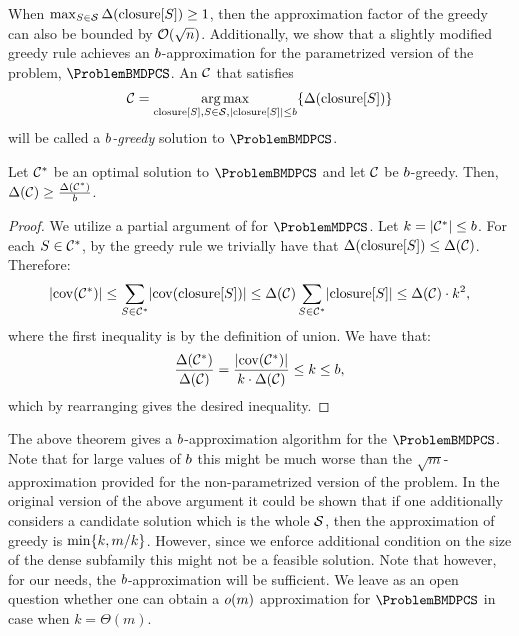 When $\max_{S \in \mathcal{S}} \Delta\mathopen{}\left( \operatorname{closure}[S] \right) \geq 1$, then the approximation factor of the greedy can also be bounded by $\mathcal{O}\mathopen{}\left( \sqrt{n} \right)$.
Additionally, we show that a slightly modified greedy rule achieves an $b$-approximation for the parametrized version of the problem, $\ProblemBMDPCS$.
An $\mathcal{C}$ that satisfies
    \[
    \mathcal{C}=\mathopen{}\operatorname*{arg\,max}_{\operatorname{closure}[S], S \in \mathcal{S}, \mathopen{}\left| \operatorname{closure}[S] \right|\leq b} \mathopen{}\left\{ \Delta\mathopen{}\left( \operatorname{closure}[S] \right) \right\}
    \]
will be called a \emph{$b$-greedy} solution to $\ProblemBMDPCS$.
\begin{theorem}\label{thm:BMDPCS-greedy}
    Let $\mathcal{C}^*$ be an optimal solution to $\ProblemBMDPCS$ and let $\mathcal{C}$ be $b$-greedy.
    Then, $\Delta\mathopen{}\left( \mathcal{C} \right) \geq \frac{\Delta\mathopen{}\left( \mathcal{C}^* \right)}{b}$.
\end{theorem}
\begin{proof}
    We utilize a partial argument of \cite{PCMSSC} for $\ProblemMDPCS$. Let $k=\mathopen{}\left| \mathcal{C}^* \right|\leq b$.
    For each $S\in \mathcal{C}^*$, by the greedy rule we trivially have that $\Delta\mathopen{}\left( \operatorname{closure}[S] \right)\leq \Delta\mathopen{}\left( \mathcal{C} \right)$.
    Therefore:
    \[
    \mathopen{}\left| \operatorname{cov}\mathopen{}\left( \mathcal{C}^* \right) \right| \leq \sum_{S\in\mathcal{C}^*}\mathopen{}\left| \operatorname{cov}\mathopen{}\left( \operatorname{closure}[S] \right) \right|\leq \Delta\mathopen{}\left( \mathcal{C} \right)\sum_{S\in\mathcal{C}^*} \mathopen{}\left| \operatorname{closure}[S] \right| \leq \Delta\mathopen{}\left( \mathcal{C} \right) \cdot k^2,
    \]
    where the first inequality is by the definition of union. We have that:
    \[
    \frac{\Delta\mathopen{}\left( \mathcal{C}^* \right)}{\Delta\mathopen{}\left( \mathcal{C} \right)}=\frac{\mathopen{}\left| \operatorname{cov}\mathopen{}\left( \mathcal{C}^* \right) \right|}{k\cdot\Delta\mathopen{}\left( \mathcal{C} \right)}\leq k\leq b,
    \]
    which by rearranging gives the desired inequality.
\end{proof}
The above theorem gives a $b$-approximation algorithm for the $\ProblemBMDPCS$. Note that for large values of $b$ this might be much worse than the $\sqrt{m}$-approximation provided for the non-parametrized version of the problem. In the original version of the above argument it could be shown that if one additionally considers a candidate solution which is the whole $\mathcal{S}$, then the approximation of greedy is $\min\mathopen{}\left\{ k, m/k \right\}$. However, since we enforce additional condition on the size of the dense subfamily this might not be a feasible solution. Note that however, for our needs, the $b$-approximation will be sufficient. We leave as an open question whether one can obtain a $o\mathopen{}\left( m \right)$ approximation for $\ProblemBMDPCS$ in case when $k=\Theta(m)$.


